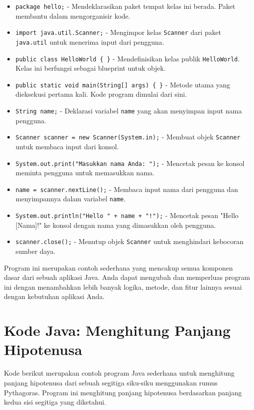 \begin{itemize}
	\item \texttt{package hello;} - Mendeklarasikan paket tempat kelas ini berada. Paket membantu dalam mengorganisir kode.
	\item \texttt{import java.util.Scanner;} - Mengimpor kelas \texttt{Scanner} dari paket \texttt{java.util} untuk menerima input dari pengguna.
	\item \texttt{public class HelloWorld \{ \}} - Mendefinisikan kelas publik \texttt{HelloWorld}. Kelas ini berfungsi sebagai blueprint untuk objek.
	\item \texttt{public static void main(String[] args) \{ \}} - Metode utama yang dieksekusi pertama kali. Kode program dimulai dari sini.
	\item \texttt{String name;} - Deklarasi variabel \texttt{name} yang akan menyimpan input nama pengguna.
	\item \texttt{Scanner scanner = new Scanner(System.in);} - Membuat objek \texttt{Scanner} untuk membaca input dari konsol.
	\item \texttt{System.out.print("Masukkan nama Anda: ");} - Mencetak pesan ke konsol meminta pengguna untuk memasukkan nama.
	\item \texttt{name = scanner.nextLine();} - Membaca input nama dari pengguna dan menyimpannya dalam variabel \texttt{name}.
	\item \texttt{System.out.println("Hello " + name + "!");} - Mencetak pesan "Hello [Nama]!" ke konsol dengan nama yang dimasukkan oleh pengguna.
	\item \texttt{scanner.close();} - Menutup objek \texttt{Scanner} untuk menghindari kebocoran sumber daya.
\end{itemize}

Program ini merupakan contoh sederhana yang mencakup semua komponen dasar dari sebuah aplikasi Java. Anda dapat mengubah dan memperluas program ini dengan menambahkan lebih banyak logika, metode, dan fitur lainnya sesuai dengan kebutuhan aplikasi Anda.

\section{Kode Java: Menghitung Panjang Hipotenusa}

Kode berikut merupakan contoh program Java sederhana untuk menghitung panjang hipotenusa dari sebuah segitiga siku-siku menggunakan rumus Pythagoras. Program ini menghitung panjang hipotenusa berdasarkan panjang kedua sisi segitiga yang diketahui.

